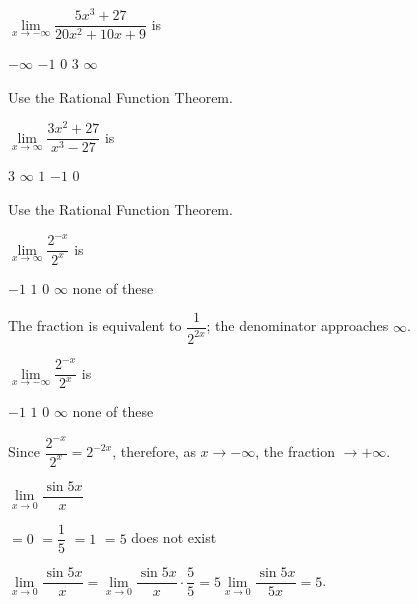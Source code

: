 \question
$\lim\limits_{x \to -\infty} \dfrac{5 x^{3}+27}{20 x^{2}+10 x+9}$ is
\begin{choices}
  \CorrectChoice $-\infty$
  \choice $-1$
  \choice $0$
  \choice $3$
  \choice $\infty$
\end{choices}
\begin{solution}
Use the Rational Function Theorem.
\end{solution}

\question
$\lim\limits_{x \to \infty} \dfrac{3 x^{2}+27}{x^{3}-27}$ is
\begin{choices}
  \choice $3$
  \choice $\infty$
  \choice $1$
  \choice $-1$
  \CorrectChoice $0$
\end{choices}
\begin{solution}
Use the Rational Function Theorem.
\end{solution}


\newpage

\question
$\lim\limits_{x \to \infty} \dfrac{2^{-x}}{2^{x}}$ is
\begin{choices}
  \choice $-1$
  \choice $1$
  \CorrectChoice $0$
  \choice $\infty$
  \choice none of these
\end{choices}
\begin{solution}
The fraction is equivalent to $\dfrac{1}{2^{2 x}}$; the denominator approaches $\infty$.
\end{solution}

\question
$\lim\limits_{x \to -\infty} \dfrac{2^{-x}}{2^{x}}$ is
\begin{choices}
  \choice $-1$
  \choice $1$
  \choice $0$
  \CorrectChoice $\infty$
  \choice none of these
\end{choices}
\begin{solution}
Since $\dfrac{2^{-x}}{2^{x}}=2^{-2 x}$, therefore, as $x \rightarrow-\infty$, the fraction $\rightarrow+\infty$.
\end{solution}

\question
$\lim\limits_{x \to 0} \dfrac{\sin 5 x}{x}$
\begin{choices}
  \choice $=0$
  \choice $=\dfrac{1}{5}$
  \choice $=1$
  \CorrectChoice $=5$
  \choice does not exist
\end{choices}
\begin{solution}
$\lim\limits_{x \to 0} \dfrac{\sin 5 x}{x}=\lim\limits_{x \to 0} \dfrac{\sin 5 x}{x} \cdot \dfrac{5}{5}=5 \lim\limits_{x \to 0} \dfrac{\sin 5 x}{5 x}=5$.
\end{solution}


\newpage

